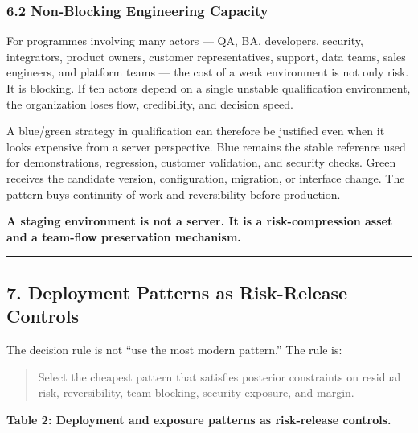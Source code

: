 \documentclass[
]{article}
\begin{document}
\subsubsection{6.2 Non-Blocking Engineering
Capacity}\label{non-blocking-engineering-capacity}

For programmes involving many actors --- QA, BA, developers, security,
integrators, product owners, customer representatives, support, data
teams, sales engineers, and platform teams --- the cost of a weak
environment is not only risk. It is blocking. If ten actors depend on a
single unstable qualification environment, the organization loses flow,
credibility, and decision speed.

A blue/green strategy in qualification can therefore be justified even
when it looks expensive from a server perspective. Blue remains the
stable reference used for demonstrations, regression, customer
validation, and security checks. Green receives the candidate version,
configuration, migration, or interface change. The pattern buys
continuity of work and reversibility before production.

\textbf{A staging environment is not a server. It is a risk-compression
asset and a team-flow preservation mechanism.}

\begin{center}\rule{0.5\linewidth}{0.5pt}\end{center}

\subsection{7. Deployment Patterns as Risk-Release
Controls}\label{deployment-patterns-as-risk-release-controls}

The decision rule is not ``use the most modern pattern.'' The rule is:

\begin{quote}
Select the cheapest pattern that satisfies posterior constraints on
residual risk, reversibility, team blocking, security exposure, and
margin.
\end{quote}

\textbf{Table 2: Deployment and exposure patterns as risk-release
controls.}
\end{document}
